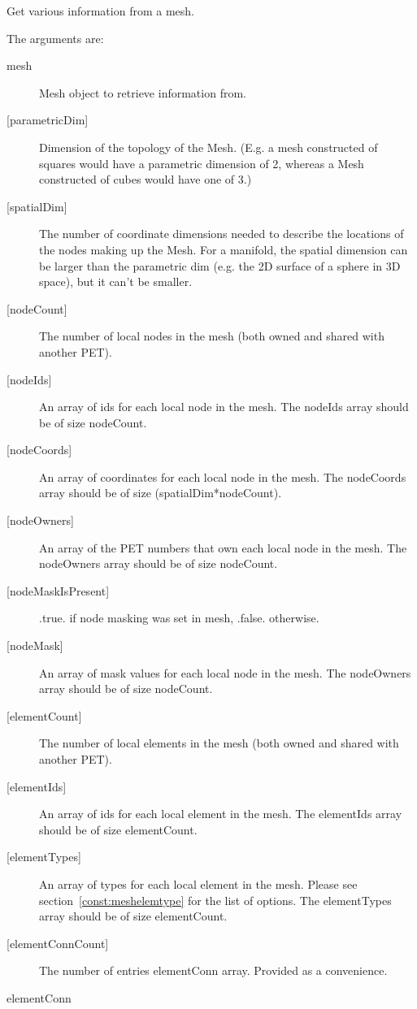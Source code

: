      Get various information from a mesh.
  
   The arguments are:
   \begin{description}
   \item [mesh]
   Mesh object to retrieve information from.
   \item [{[parametricDim]}]
   Dimension of the topology of the Mesh. (E.g. a mesh constructed of squares would
   have a parametric dimension of 2, whereas a Mesh constructed of cubes would have one
   of 3.)
   \item[{[spatialDim]}]
   The number of coordinate dimensions needed to describe the locations of the nodes
   making up the Mesh. For a manifold, the spatial dimension can be larger than the
   parametric dim (e.g. the 2D surface of a sphere in 3D space), but it can't be smaller.
   \item [{[nodeCount]}]
   The number of local nodes in the mesh (both owned and shared with another PET).
   \item [{[nodeIds]}]
   An array of ids for each local node in the mesh. The nodeIds array should be of size nodeCount.
   \item [{[nodeCoords]}]
   An array of  coordinates for each local node in the mesh. The nodeCoords array should be of size (spatialDim*nodeCount).
   \item [{[nodeOwners]}]
   An array of the PET numbers that own each local node in the mesh. The nodeOwners array should be of size nodeCount.
   \item [{[nodeMaskIsPresent]}]
   .true. if node masking was set in mesh, .false. otherwise.
   \item [{[nodeMask]}]
   An array of mask values for each local node in the mesh. The nodeOwners array should be of size nodeCount.
   \item [{[elementCount]}]
   The number of local elements in the mesh (both owned and shared with another PET).
   \item [{[elementIds]}]
   An array of ids for each local element in the mesh. The elementIds array should be of size elementCount.
   \item [{[elementTypes]}]
   An array of types for each local element in the mesh. Please see
   section~\ref{const:meshelemtype} for the list of options. The elementTypes array should be of size elementCount.
   \item [{[elementConnCount]}]
   The number of entries elementConn array. Provided as a convenience.
   \item[elementConn]

\end{description}
